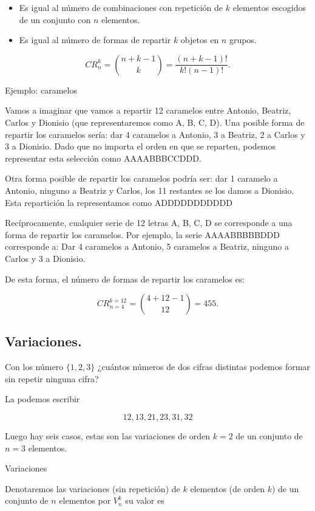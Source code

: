 \documentclass[
  letterpaper,
  DIV=11,
  numbers=noendperiod]{scrreprt}
\providecommand{\tightlist}{%
  \setlength{\itemsep}{0pt}\setlength{\parskip}{0pt}}\usepackage{longtable,booktabs,array}
\begin{document}
\begin{itemize}
\tightlist
\item
  Es igual al número de combinaciones con repetición de \(k\) elementos
  escogidos de un conjunto con \(n\) elementos.
\item
  Es igual al número de formas de repartir \(k\) objetos en \(n\)
  grupos.
\end{itemize}

\[CR_n^k = \binom{n+k-1}{k} = \frac{(n+k-1)!}{k!(n-1)!}.\]

Ejemplo: caramelos

Vamos a imaginar que vamos a repartir 12 caramelos entre Antonio,
Beatriz, Carlos y Dionisio (que representaremos como A, B, C, D). Una
posible forma de repartir los caramelos sería: dar 4 caramelos a
Antonio, 3 a Beatriz, 2 a Carlos y 3 a Dionisio. Dado que no importa el
orden en que se reparten, podemos representar esta selección como
AAAABBBCCDDD.

Otra forma posible de repartir los caramelos podría ser: dar 1 caramelo
a Antonio, ninguno a Beatriz y Carlos, los 11 restantes se los damos a
Dionisio. Esta repartición la representamos como ADDDDDDDDDDD

Recíprocamente, cualquier serie de 12 letras A, B, C, D se corresponde a
una forma de repartir los caramelos. Por ejemplo, la serie AAAABBBBBDDD
corresponde a: Dar 4 caramelos a Antonio, 5 caramelos a Beatriz, ninguno
a Carlos y 3 a Dionisio.

De esta forma, el número de formas de repartir los caramelos es:

\[CR_{n=4}^{k=12} = \binom{4+12-1}{12}=455.\]

\subsection{Variaciones.}\label{variaciones.}

Con los número \(\{1,2,3\}\) ¿cuántos números de dos cifras distintas
podemos formar sin repetir ninguna cifra?

La podemos escribir

\[12,13,21,23,31,32\]

Luego hay seis casos, estas son las variaciones de orden \(k=2\) de un
conjunto de \(n=3\) elementos.

Variaciones

Denotaremos las variaciones (sin repetición) de \(k\) elementos (de
orden \(k\)) de un conjunto de \(n\) elementos por \(V_n^k\) su valor es
\end{document}
